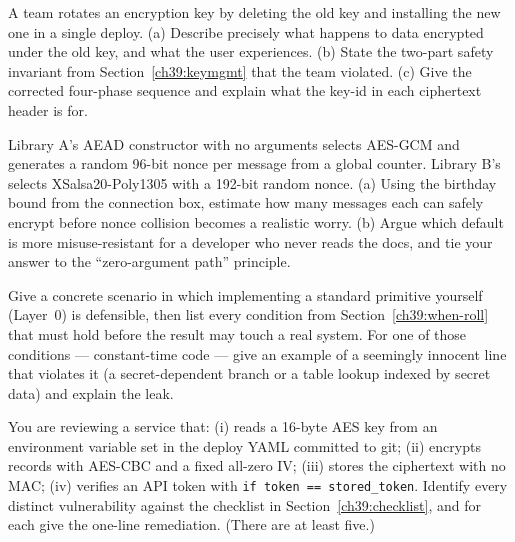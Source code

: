 \begin{exercise}
A team rotates an encryption key by deleting the old key and installing the new one
in a single deploy. (a) Describe precisely what happens to data encrypted under the
old key, and what the user experiences. (b) State the two-part safety invariant
from Section~\ref{ch39:keymgmt} that the team violated. (c) Give the corrected
four-phase sequence and explain what the key-id in each ciphertext header is for.
\end{exercise}

\begin{exercise}
Library A's AEAD constructor with no arguments selects AES-GCM and generates a
random 96-bit nonce per message from a global counter. Library B's selects
XSalsa20-Poly1305 with a 192-bit random nonce. (a) Using the birthday bound from
the connection box, estimate how many messages each can safely encrypt before nonce
collision becomes a realistic worry. (b) Argue which default is more
misuse-resistant for a developer who never reads the docs, and tie your answer to
the ``zero-argument path'' principle.
\end{exercise}

\begin{exercise}
Give a concrete scenario in which implementing a standard primitive yourself
(Layer~0) is defensible, then list every condition from Section~\ref{ch39:when-roll}
that must hold before the result may touch a real system. For one of those
conditions --- constant-time code --- give an example of a seemingly innocent line
that violates it (a secret-dependent branch or a table lookup indexed by secret
data) and explain the leak.
\end{exercise}

\begin{exercise}
You are reviewing a service that: (i) reads a 16-byte AES key from an environment
variable set in the deploy YAML committed to git; (ii) encrypts records with
AES-CBC and a fixed all-zero IV; (iii) stores the ciphertext with no MAC; (iv)
verifies an API token with \texttt{if token == stored\_token}. Identify every
distinct vulnerability against the checklist in Section~\ref{ch39:checklist}, and
for each give the one-line remediation. (There are at least five.)
\end{exercise}
